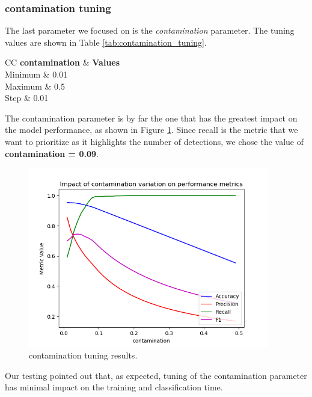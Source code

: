 \documentclass[futureinternet,article,submit,pdftex,moreauthors]{Definitions/mdpi}
\begin{document}
\subsubsection{contamination tuning}

The last parameter we focused on is the \textit{contamination} parameter. The tuning values are shown in Table \ref{tab:contamination_tuning}.

\begin{table}[H]
	\caption{contamination tuning values.}\label{tab:contamination_tuning}
	\begin{tabularx}{\textwidth}{CC}
	\toprule
	\textbf{contamination} & \textbf{Values} \\
	\midrule
	Minimum & 0.01 \\
	Maximum & 0.5 \\
	Step & 0.01 \\
	\bottomrule
	\end{tabularx}
\end{table}

The contamination parameter is by far the one that has the greatest impact on the model performance, as shown in Figure \ref{fig:contamination_tuning}.
Since recall is the metric that we want to prioritize as it highlights the number of detections, we chose the value of \textbf{contamination = 0.09}.

\begin{figure}[H]
	\centering
	\includegraphics[width=10.5cm]{img/contaminationTuning.png}
	\caption{contamination tuning results.}\label{fig:contamination_tuning}
\end{figure}
\unskip

Our testing pointed out that, as expected, tuning of the contamination parameter has minimal impact on the training and classification time. 
\end{document}
